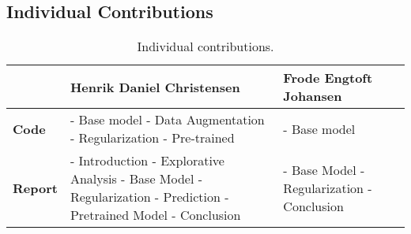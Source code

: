 \subsection{Individual Contributions}
\begin{table}[H]
    \centering
    \begin{tabular}{|l|p{5cm}|p{5cm}|}
    \hline
                    & \textbf{Henrik Daniel Christensen} & \textbf{Frode Engtoft Johansen} \\ \hline
    \textbf{Code}   & - Base model \newline - Data Augmentation \newline - Regularization \newline - Pre-trained & - Base model\\ \hline
    \textbf{Report} & - Introduction \newline - Explorative Analysis \newline - Base Model \newline - Regularization \newline - Prediction \newline - Pretrained Model \newline - Conclusion & - Base Model  \newline - Regularization \newline - Conclusion \\ \hline
    \end{tabular}
    \caption{Individual contributions.}
    \label{tab:individual_contributions}
\end{table}
